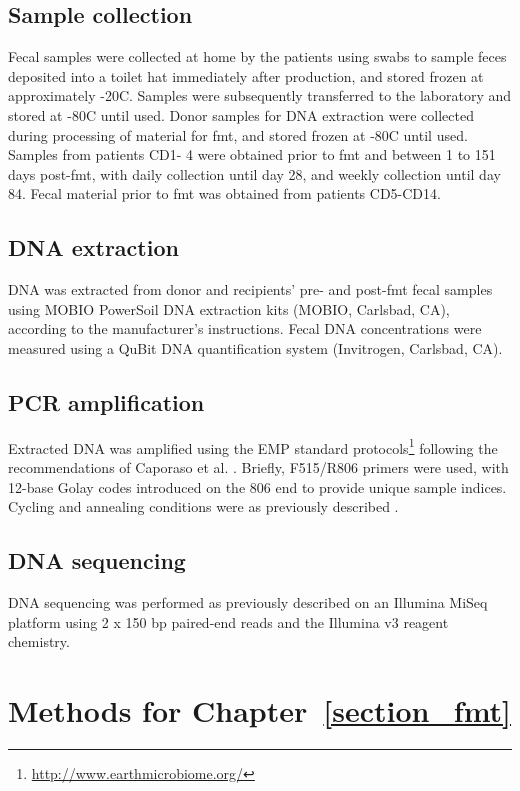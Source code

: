 \subsection{Sample collection}
Fecal samples were collected at home by the patients using swabs to sample 
feces deposited into a toilet hat immediately after production, and stored 
frozen at approximately -20\textdegree C. Samples were subsequently transferred 
to the laboratory and stored at -80\textdegree C until used. Donor samples for 
DNA extraction were collected during processing of material for \gls{fmt}, and 
stored frozen at       -80\textdegree C until used. Samples from patients CD1- 
4 were obtained prior to \gls{fmt} and between 1 to 151 days post-\gls{fmt}, 
with daily collection until day 28, and weekly collection until day 84. Fecal 
material prior to \gls{fmt} was obtained from patients CD5-CD14.

\subsection{DNA extraction}
DNA was extracted from donor and recipients' pre- and post-\gls{fmt} fecal 
samples using MOBIO PowerSoil DNA extraction kits (MOBIO, Carlsbad, CA), 
according to the manufacturer's instructions. Fecal DNA concentrations were 
measured using a QuBit DNA quantification system (Invitrogen, Carlsbad, CA).

\subsection{PCR amplification}
Extracted DNA was amplified using the EMP standard 
protocols\footnote{\url{http://www.earthmicrobiome.org/}} following the 
recommendations of Caporaso et al. \cite{RN4221}. Briefly, F515/R806 primers 
were used, with 12-base Golay codes introduced on the 806 end to provide unique 
sample indices. Cycling and annealing conditions were as previously described 
\cite{RN4221}.

\subsection{DNA sequencing}
DNA sequencing was performed as previously described \cite{RN4221} on an 
Illumina MiSeq platform using 2 x 150 bp paired-end reads and the Illumina v3 
reagent chemistry. 

\section{Methods for Chapter~\ref{section_fmt}}\label{appendix_fmt}

